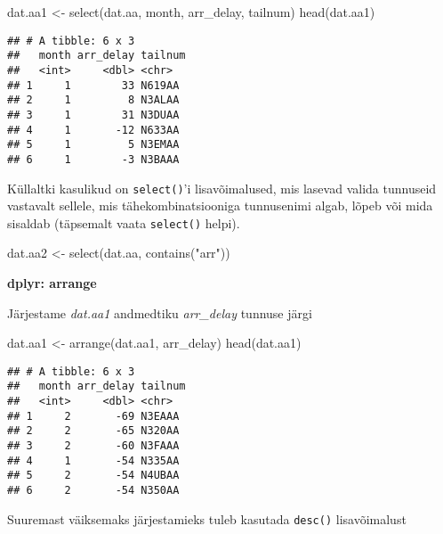 \documentclass[
]{book}
\newenvironment{Shaded}{\begin{snugshade}}{\end{snugshade}}
\newcommand{\FunctionTok}[1]{\textcolor[rgb]{0.00,0.00,0.00}{#1}}
\newcommand{\NormalTok}[1]{#1}
\newcommand{\OtherTok}[1]{\textcolor[rgb]{0.56,0.35,0.01}{#1}}
\newcommand{\StringTok}[1]{\textcolor[rgb]{0.31,0.60,0.02}{#1}}
\begin{document}
\begin{Shaded}
\begin{Highlighting}[]
\NormalTok{dat.aa1 }\OtherTok{\textless{}{-}} \FunctionTok{select}\NormalTok{(dat.aa, month, arr\_delay, tailnum)}
\FunctionTok{head}\NormalTok{(dat.aa1)}
\end{Highlighting}
\end{Shaded}

\begin{verbatim}
## # A tibble: 6 x 3
##   month arr_delay tailnum
##   <int>     <dbl> <chr>  
## 1     1        33 N619AA 
## 2     1         8 N3ALAA 
## 3     1        31 N3DUAA 
## 4     1       -12 N633AA 
## 5     1         5 N3EMAA 
## 6     1        -3 N3BAAA
\end{verbatim}

Küllaltki kasulikud on \texttt{select()}'i lisavõimalused, mis lasevad valida tunnuseid vastavalt sellele, mis tähekombinatsiooniga tunnusenimi algab, lõpeb või mida sisaldab (täpsemalt vaata \texttt{select()} helpi).

\begin{Shaded}
\begin{Highlighting}[]
\NormalTok{dat.aa2 }\OtherTok{\textless{}{-}} \FunctionTok{select}\NormalTok{(dat.aa, }\FunctionTok{contains}\NormalTok{(}\StringTok{"arr"}\NormalTok{))}
\end{Highlighting}
\end{Shaded}

\textbf{dplyr: arrange}

Järjestame \emph{dat.aa1} andmedtiku \emph{arr\_delay} tunnuse järgi

\begin{Shaded}
\begin{Highlighting}[]
\NormalTok{dat.aa1 }\OtherTok{\textless{}{-}} \FunctionTok{arrange}\NormalTok{(dat.aa1, arr\_delay)}
\FunctionTok{head}\NormalTok{(dat.aa1)}
\end{Highlighting}
\end{Shaded}

\begin{verbatim}
## # A tibble: 6 x 3
##   month arr_delay tailnum
##   <int>     <dbl> <chr>  
## 1     2       -69 N3EAAA 
## 2     2       -65 N320AA 
## 3     2       -60 N3FAAA 
## 4     1       -54 N335AA 
## 5     2       -54 N4UBAA 
## 6     2       -54 N350AA
\end{verbatim}

Suuremast väiksemaks järjestamieks tuleb kasutada \texttt{desc()} lisavõimalust
\end{document}
